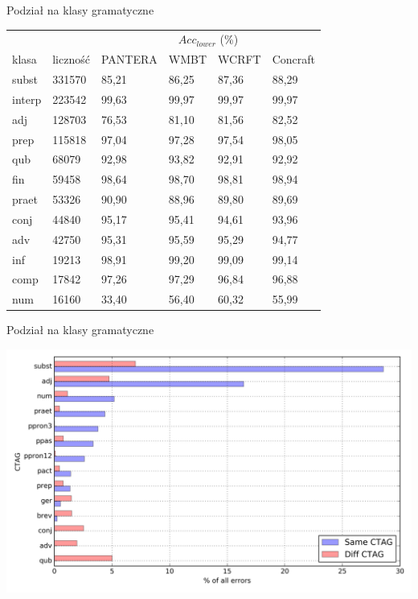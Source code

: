 \documentclass[xcolor=dvipsnames,polish]{beamer}
\begin{document}
\begin{frame}{Podział na klasy gramatyczne}
\begin{center}
\begin{tabular}{llllll}
 &  & \multicolumn{4}{c}{$Acc_{lower}$ (\%)} \\
klasa & liczność & PANTERA & WMBT & WCRFT & Concraft \\
\hline
subst & 331570 & 85,21 & 86,25 & 87,36 & 88,29 \\
interp & 223542 & 99,63 & 99,97 & 99,97 & 99,97 \\
adj & 128703 & 76,53 & 81,10 & 81,56 & 82,52 \\
prep & 115818 & 97,04 & 97,28 & 97,54 & 98,05 \\
qub & 68079 & 92,98 & 93,82 & 92,91 & 92,92 \\
fin & 59458 & 98,64 & 98,70 & 98,81 & 98,94 \\
praet & 53326 & 90,90 & 88,96 & 89,80 & 89,69 \\
conj & 44840 & 95,17 & 95,41 & 94,61 & 93,96 \\
adv & 42750 & 95,31 & 95,59 & 95,29 & 94,77 \\
inf & 19213 & 98,91 & 99,20 & 99,09 & 99,14 \\
comp & 17842 & 97,26 & 97,29 & 96,84 & 96,88 \\
num & 16160 & 33,40 & 56,40 & 60,32 & 55,99 \\
\end{tabular}
\end{center}
\end{frame}

\begin{frame}{Podział na klasy gramatyczne}
  \begin{center}
    \includegraphics[width=\textwidth]{img/ctag_errs.png}
  \end{center}
\end{frame}
\end{document}
